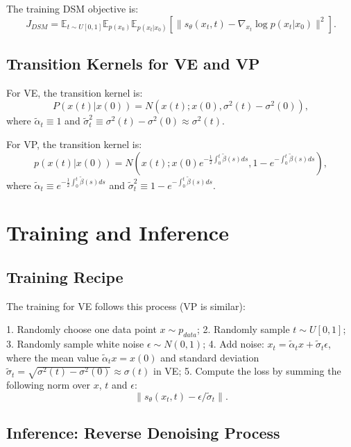 The training DSM objective is:
\begin{equation}
J_{DSM} = \mathbb{E}_{t \sim U[0,1]}\mathbb{E}_{p(x_0)}\mathbb{E}_{p(x_t|x_0)}\left[\|s_\theta(x_t,t) - \nabla_{x_t}\log p(x_t|x_0)\|^2\right].
\end{equation}

\subsection{Transition Kernels for VE and VP}

For VE, the transition kernel is:
\begin{equation}
P(x(t)|x(0)) = N(x(t); x(0), \sigma^2(t)-\sigma^2(0)),
\end{equation}
where $\tilde{\alpha}_t \equiv 1$ and $\tilde{\sigma}^2_t \equiv \sigma^2(t)-\sigma^2(0) \approx \sigma^2(t)$.

For VP, the transition kernel is:
\begin{equation}
p(x(t)|x(0)) = N\left(x(t); x(0)e^{-\frac{1}{2}\int_0^t \tilde{\beta}(s)ds}, 1-e^{-\int_0^t \tilde{\beta}(s)ds}\right),
\end{equation}
where $\tilde{\alpha}_t \equiv e^{-\frac{1}{2}\int_0^t \tilde{\beta}(s)ds}$ and $\tilde{\sigma}^2_t \equiv 1-e^{-\int_0^t \tilde{\beta}(s)ds}$.

\section{Training and Inference}

\subsection{Training Recipe}

The training for VE follows this process (VP is similar):

1. Randomly choose one data point $x \sim p_{data}$;
2. Randomly sample $t \sim U[0, 1]$;
3. Randomly sample white noise $\epsilon \sim N(0, 1)$;
4. Add noise: $x_t = \tilde{\alpha}_t x + \tilde{\sigma}_t\epsilon$, where the mean value $\tilde{\alpha}_t x = x(0)$ and standard deviation $\tilde{\sigma}_t = \sqrt{\sigma^2(t)-\sigma^2(0)} \approx \sigma(t)$ in VE;
5. Compute the loss by summing the following norm over $x$, $t$ and $\epsilon$:
\begin{equation}
\|s_\theta(x_t, t) - \epsilon/\tilde{\sigma}_t\|.
\end{equation}

\subsection{Inference: Reverse Denoising Process}

